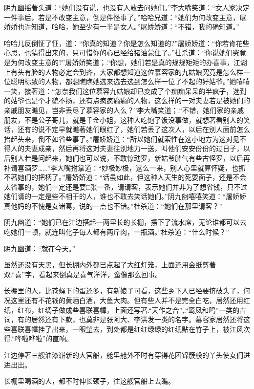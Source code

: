 \documentclass[12pt,oneside]{book}
\begin{document}
阴九幽摇著头道：``她们没有说，也没有人敢去问她们。''李大嘴笑道：``女人家决定一件事后，若是不改变主意，倒是件怪事了。''哈哈兄道：``她们为何改变主意，屠娇娇也许知道，哈哈，她至少有一半是女人。''屠娇娇道：``不错，我的确知道。''

哈哈儿反倒怔了怔，道：``你真的知道？你是怎么知道的?''屠娇娇道：``你若肯花些心思，也猜得出来的，只可惜你的心已经给猪油蒙住了。''杜杀道：``你说她们究竟是为何改变主意的?''屠娇娇笑道；.``你想，她们若是真的规规矩矩的办喜事，江湖上有头有脸的人物必定会到齐，大家都想知道这位慕容家的九姑娘究竟是怎么样一位聪明标致的人物，都想瞧瞧她选来选去选到怎么样一位了不起的好姑爷。''她嘻嘻一笑，接著道：``怎奈我们这位慕容九姑娘却已变成了个痴痴呆呆的半疯子，选到的姑爷也是个才貌不扬，还有点疯疯癫癫的人物，这么样的一对夫妻若是被她们的亲戚朋友瞧见，岂非丢尽了慕容家的人么？''李大嘴笑道；.``不错，她们家的亲戚朋友，不是公子哥儿，就是千金小姐，这种人吃饱了饭没事做，就想著看别人的笑话，还有的说不定早就瞧著她们眼红了，她们若丢了这次人，以后在别人面前怎么抬起头来，倒不如省些事了。''屠娇娇道：``所以她们就索性在这小地方为这对见不得人的夫妻成亲，然后再将这对夫妻往别地力一送，叫他们安安份份的过日子，以后别人若是问起来，她们也可以说，不敢惊动罗，新姑爷脾气有些古怪罗，以后再补请喜酒罗\ldots\ldots{}''李大嘴拊掌道：``妙极妙极，这么一来，别人心里就算怀疑，也抓不著她们的把柄了。''屠娇娇道：``话虽如此，但这种人天生的死要面子，还是不会太省事的，她们一定还是要□张一番，请请客，表示她们并非为了想省钱，只不过她们请的一定是些不相干的人，谁也不敢去笑话她们。''阴九幽嘻嘻笑道：``屠娇娇真他妈的不愧是女诸葛，说的一点也不错。''杜杀道：``她们在那里请客？''

阴九幽道：``她们已在江边搭起一两里长的长棚，摆下了流水席，无论谁都可以去吃她们一顿，就连叫化子每人都有两斤肉，一瓶酒。''杜杀道：``什么时候？''

阴九幽道：``就在今天。''

虽然还没有天黑，但长棚内外都已点起了大红灯笼，上面还用金纸剪著双.``喜''字，看起来倒真是喜气洋洋，蛮像那么回事。

长棚里的人，比苍蝇下的蛋还多，有新娘子可看，这些乡下人已经要挤破头了，何况这里还有不花钱的黄酒白酒，大鱼大肉。但有些人并不是完全白吃，居然还用红纸，红布，红绸子做成些喜联喜幛，上面还写著.``天作之合'',.``鸾凤和鸣''一类的吉词，有的居然还有下款，也莫非是张阿大、李洪发一类的名字。慕容家居然还将这些喜联喜幛挂了出来，一眼望去，到处都是红红绿绿的红纸贴在竹子上，被江风次得.``哗啦哗啦''的直响。

江边停著三艘油漆崭新的大官船，舱里舱外不时有穿得花团锦簇般的丫头使女们进进出出。

长棚里喝酒的人，都不时伸长颈子，往这艘官船上去瞧。
\end{document}
